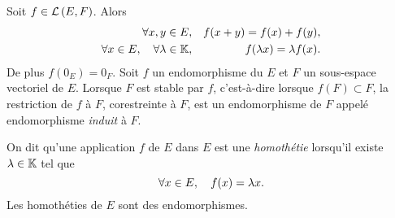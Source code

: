 \documentclass{magnolia}
\begin{document}
\begin{remarques}
\remarque Soit $f\in\mathcal{L}\left(E,F\right)$. Alors
\begin{eqnarray*}
\forall x,y\in E,& & f(x+y)=f(x)+f(y),\\
\forall x\in E,\quad \forall \lambda\in\mathbb{K},& & f(\lambda x)=\lambda f(x).
\end{eqnarray*}
De plus $f(0_E)=0_F$.
\remarque Soit $f$ un endomorphisme du \Kev $E$ et $F$ un sous-espace
  vectoriel de $E$. Lorsque $F$ est stable par $f$, c'est-à-dire
  lorsque $f(F)\subset F$, la restriction de $f$ à $F$, corestreinte à $F$, est
  un endomorphisme de $F$ appelé endomorphisme \emph{induit} à $F$.
\end{remarques}


\begin{definition}[utile=-2]
On dit qu'une application $f$ de $E$ dans $E$ est une \emph{homothétie} lorsqu'il
existe $\lambda\in\mathbb{K}$ tel que
\[\forall x\in E ,\quad f(x)=\lambda x.\]
Les homothéties de $E$ sont des endomorphismes.
\end{definition}
\end{document}
